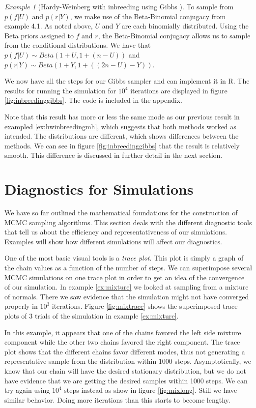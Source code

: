 \documentclass[11pt]{amsart}
\theoremstyle{theorem} %
\theoremstyle{definition}                  %
\theoremstyle{example}                       %
\theoremstyle{remark}                       %
\newtheorem{exmp}[thm]{Example}  %
\numberwithin{equation}{section}
\begin{document}
\begin{exmp}[{Hardy-Weinberg with inbreeding using Gibbs \cite{stephens}}]
To sample from $p(f|U)$ and $p(r|Y)$, we make use of the Beta-Binomial conjugacy from example 4.1. As noted above, $U$ and $Y$ are each binomially distributed. Using the Beta priors assigned to $f$ and $r$, the Beta-Binomial conjugacy allows us to sample from the conditional distributions. We have that $p(f|U)\sim Beta(1+U, 1+(n-U))$ and $p(r|Y)\sim Beta(1+Y, 1+((2n-U)-Y))$.

We now have all the steps for our Gibbs sampler and can implement it in R. The results for running the simulation for $10^4$ iterations are displayed in figure \ref{fig:inbreedinggibbs}. The code is included in the appendix.

Note that this result has more or less the same mode as our previous result in exampled \ref{ex:hwinbreedingmh}, which suggests that both methods worked as intended. The distributions are different, which shows differences between the methods. We can see in figure \ref{fig:inbreedinggibbs} that the result is relatively smooth. This difference is discussed in further detail in the next section.
\end{exmp}

\section{Diagnostics for Simulations}

We have so far outlined the mathematical foundations for the construction of MCMC sampling algorithms. This section deals with the different diagnostic tools that tell us about the efficiency and representativeness of our simulations. Examples will show how different simulations will affect our diagnostics.

One of the most basic visual tools is a {\em trace plot}\cite[p.179]{dogs}. This plot is simply a graph of the chain values as a function of the number of steps. We can superimpose several MCMC simulations on one trace plot in order to get an idea of the convergence of our simulation. In example \ref{ex:mixture} we looked at sampling from a mixture of normals. There we saw evidence that the simulation might not have converged properly in $10^3$ iterations. Figure \ref{fig:mixtrace} shows the superimposed trace plots of 3 trials of the simulation in example \ref{ex:mixture}.

In this example, it appears that one of the chains favored the left side mixture component while the other two chains favored the right component. The trace plot shows that the different chains favor different modes, thus not generating a representative sample from the distribution within 1000 steps. Asymptotically, we know that our chain will have the desired stationary distribution, but we do not have evidence that we are getting the desired samples within 1000 steps. We can try again using $10^4$ steps instead as show in figure \ref{fig:mixlong}. Still we have similar behavior. Doing more iterations than this starts to become lengthy.
\end{document}
